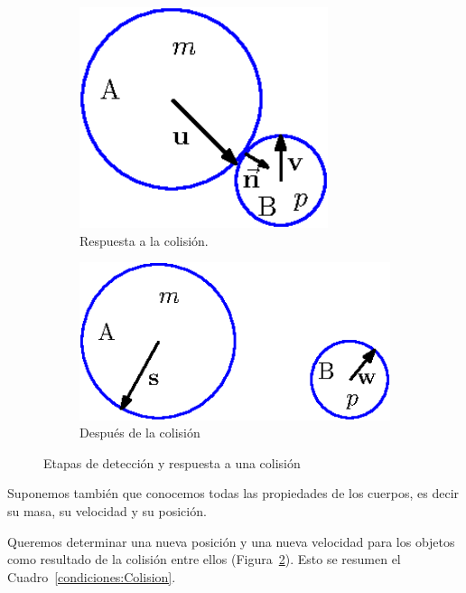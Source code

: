 \begin{figure}
  \begin{subfigure}[b]{0.32\textwidth}
    \includegraphics[width=0.8\textwidth]{Img/02/colisionesResponde}
    \caption{Respuesta a la colisión.}
    \label{fig:coliResponde}
  \end{subfigure}
  \hspace{2cm}
  \begin{subfigure}[b]{0.32\textwidth}
    \includegraphics[width=1.1\textwidth]{Img/02/colisionesAjusta}
    \caption{Después de la colisión}
    \label{fig:coliAjusta}
  \end{subfigure}
 \caption[Colisión elástica]{Etapas de detección y respuesta a una colisión} 
 \label{colision:fig}
\end{figure}

Suponemos también que conocemos todas las propiedades de los cuerpos, es decir su masa, su velocidad y su posición.

Queremos determinar una nueva posición y una nueva velocidad para los objetos como resultado de la colisión entre ellos (Figura~\ref{fig:coliAjusta}).
Esto se resumen el Cuadro~\ref{condiciones:Colision}.


